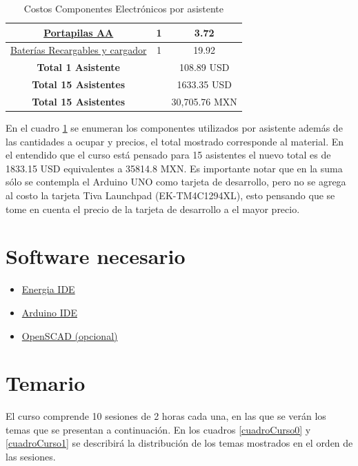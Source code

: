 \documentclass[]{article}
\begin{document}
\begin{table}[h!]
\begin{tabular}{||c|c|c||}
		\href{https://www.digikey.com.mx/product-detail/es/mpd-memory-protection-devices/BH4AAW/BH4AA-W-ND/32051}{Portapilas AA} & 1 & 3.72    \\ \hline
		   \href{https://www.digikey.com.mx/product-detail/es/energizer-battery-company/CHPROWB4/N734-ND/7403296}{Baterías Recargables y cargador} & 1 &  19.92   \\ \hline
		  \textbf{Total 1 Asistente} & & 108.89 USD\\ \hline
		   \textbf{Total 15 Asistentes} & & 1633.35 USD\\ \hline
		   \textbf{Total 15 Asistentes} & &   30,705.76  MXN\\ \hline
	\end{tabular}
	\caption{Costos Componentes Electrónicos por asistente}
	\label{costos}
\end{table}

En el cuadro \ref{costos} se enumeran los componentes utilizados por asistente además de las cantidades a ocupar y precios, el total mostrado corresponde al material. En el entendido que el curso está pensado para 15 asistentes el nuevo total es de 1833.15 USD equivalentes a 35814.8 MXN. Es importante notar que en la suma sólo se contempla el Arduino UNO como tarjeta de desarrollo, pero no se agrega al costo la tarjeta Tiva Launchpad (EK-TM4C1294XL), esto pensando que se tome en cuenta el precio de la tarjeta de desarrollo a el mayor precio. \\


\section{Software necesario}

\begin{itemize}
	
	\item \href{https://energia.nu/download/}{Energia IDE}
    \item \href{https://www.arduino.cc/en/Main/Software}{Arduino IDE}
    \item \href{http://www.openscad.org}{OpenSCAD (opcional)}
\end{itemize}

\section{Temario}

El curso comprende 10 sesiones de 2 horas cada una, en las que se verán los temas que se presentan a continuación. En los cuadros \ref{cuadroCurso0} y \ref{cuadroCurso1} se describirá la distribución de los temas mostrados en el orden de las sesiones.\\
\end{document}
